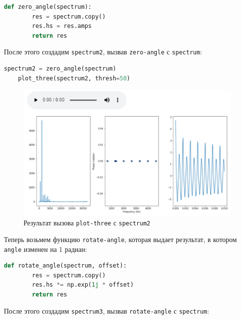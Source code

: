 \documentclass[a4paper]{article}
\begin{document}
\begin{lstlisting}[language=Python, caption= Функция \texttt{zero-angle}]
    def zero_angle(spectrum):
        res = spectrum.copy()
        res.hs = res.amps
        return res
\end{lstlisting} 
            
            После этого создадим \texttt{spectrum2}, вызвав \texttt{zero-angle} с \texttt{spectrum}:
            
\begin{lstlisting}[language=Python, caption= Вызов \texttt{plot-three} с \texttt{spectrum2}]
    spectrum2 = zero_angle(spectrum)
    plot_three(spectrum2, thresh=50)
\end{lstlisting} 
            
            \begin{figure}[H]
                \centering
                \includegraphics[width=\textwidth]{ex_3_spectrum2.png}
                \caption{Результат вызова \texttt{plot-three} с \texttt{spectrum2}}
                \label{fig:ex_3_spectrum2}
            \end{figure}
            
            Теперь возьмем функцию \texttt{rotate-angle}, которая выдает результат, в котором \texttt{angle} изменен на 1 радиан:
            
\begin{lstlisting}[language=Python, caption= Функция \texttt{rotate-angle}]
    def rotate_angle(spectrum, offset):
        res = spectrum.copy()
        res.hs *= np.exp(1j * offset)
        return res
\end{lstlisting} 
            
            После этого создадим \texttt{spectrum3}, вызвав \texttt{rotate-angle} с \texttt{spectrum}:
            
\end{document}
